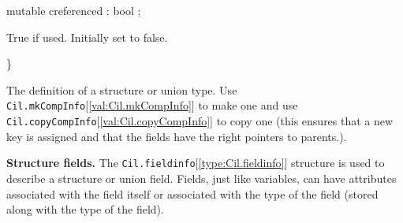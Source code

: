 \documentclass[11pt]{article}
\begin{document}
\begin{ocamldoccode}
  mutable creferenced : bool ;
\end{ocamldoccode}
\begin{ocamldoccomment}
True if used. Initially set to false.
\end{ocamldoccomment}
\begin{ocamldoccode}
\}
\end{ocamldoccode}
\begin{ocamldocdescription}
The definition of a structure or union type. Use {\tt{Cil.mkCompInfo}}[\ref{val:Cil.mkCompInfo}] to 
 make one and use {\tt{Cil.copyCompInfo}}[\ref{val:Cil.copyCompInfo}] to copy one (this ensures that a new 
 key is assigned and that the fields have the right pointers to parents.).


\end{ocamldocdescription}




{\bf Structure fields.} The {\tt{Cil.fieldinfo}}[\ref{type:Cil.fieldinfo}] structure is used to describe 
 a structure or union field. Fields, just like variables, can have 
 attributes associated with the field itself or associated with the type of 
 the field (stored along with the type of the field).
\end{document}
